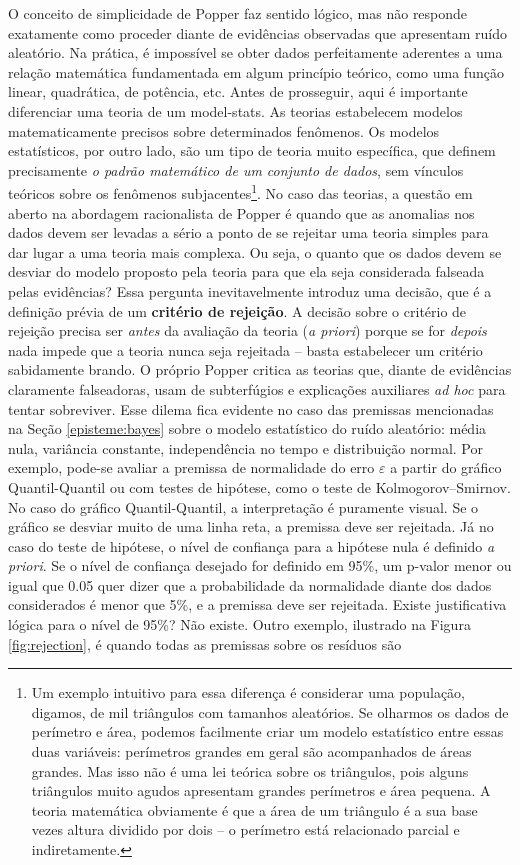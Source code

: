 \documentclass[./main.tex]{subfiles}
\begin{document}
\par O conceito de simplicidade de Popper faz sentido lógico, mas não responde exatamente como proceder diante de evidências observadas que apresentam ruído aleatório. Na prática, é impossível se obter dados perfeitamente aderentes a uma relação matemática fundamentada em algum princípio teórico, como uma função linear, quadrática, de potência, etc. Antes de prosseguir, aqui é importante diferenciar uma  teoria de um \gls{model-stats}. As teorias estabelecem modelos matematicamente precisos sobre determinados fenômenos. Os modelos estatísticos, por outro lado, são um tipo de teoria muito específica, que definem precisamente \textit{o padrão matemático de um conjunto de dados}, sem vínculos teóricos sobre os fenômenos subjacentes\footnote{Um exemplo intuitivo para essa diferença é considerar uma população, digamos, de mil triângulos com tamanhos aleatórios. Se olharmos os dados de perímetro e área, podemos facilmente criar um modelo estatístico entre essas duas variáveis: perímetros grandes em geral são acompanhados de áreas grandes. Mas isso não é uma lei teórica sobre os triângulos, pois alguns triângulos muito agudos apresentam grandes perímetros e área pequena. A teoria matemática obviamente é que a área de um triângulo é a sua base vezes altura dividido por dois -- o perímetro está relacionado parcial e indiretamente.}. No caso das teorias, a questão em aberto na abordagem racionalista de Popper é quando que as anomalias nos dados devem ser levadas a sério a ponto de se rejeitar uma teoria simples para dar lugar a uma teoria mais complexa. Ou seja, o quanto que os dados devem se desviar do modelo proposto pela teoria para que ela seja considerada falseada pelas evidências? Essa pergunta inevitavelmente introduz uma decisão, que é a definição prévia de um \textbf{critério de rejeição}. A decisão sobre o critério de rejeição precisa ser \textit{antes} da avaliação da teoria (\textit{a priori}) porque se for \textit{depois} nada impede que a teoria nunca seja rejeitada -- basta estabelecer um critério sabidamente brando. O próprio Popper critica as teorias que, diante de evidências claramente falseadoras, usam de subterfúgios e explicações auxiliares \textit{ad hoc} para tentar sobreviver. Esse dilema fica evidente no caso das premissas mencionadas na Seção \ref{episteme:bayes} sobre o modelo estatístico do ruído aleatório: média nula, variância constante, independência no tempo e distribuição normal. Por exemplo, pode-se avaliar a premissa de normalidade do erro $\varepsilon$ a partir do gráfico Quantil-Quantil ou com testes de hipótese, como o teste de Kolmogorov–Smirnov. No caso do gráfico Quantil-Quantil, a interpretação é puramente visual. Se o gráfico se desviar muito de uma linha reta, a premissa deve ser rejeitada. Já no caso do teste de hipótese, o nível de confiança para a hipótese nula é definido \textit{a priori}. Se o nível de confiança desejado for definido em 95\%, um p-valor menor ou igual que 0.05 quer dizer que a probabilidade da normalidade diante dos dados considerados é menor que 5\%, e a premissa deve ser rejeitada. Existe justificativa lógica para o nível de 95\%? Não existe. Outro exemplo, ilustrado na Figura \ref{fig:rejection}, é quando todas as premissas sobre os resíduos são 
\end{document}
